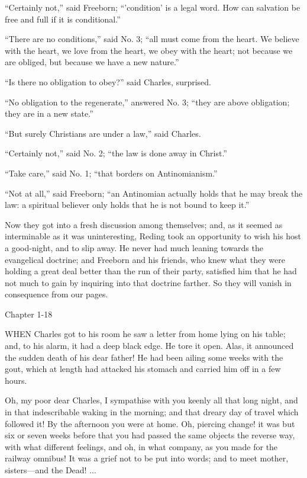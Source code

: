 ``Certainly not,'' said Freeborn; ``'condition' is a
legal word. How can salvation be free and full if it is
conditional.''

``There are no conditions,'' said No. 3; ``all must
come from the heart. We believe with the heart, we love from the
heart, we obey with the heart; not because we are obliged, but because
we have a new nature.''

``Is there no obligation to obey?'' said Charles,
surprised.

``No obligation to the regenerate,'' answered No. 3;
``they are above obligation; they are in a new state.''

``But surely Christians are under a law,'' said Charles.

``Certainly not,'' said No. 2; ``the law is done away
in Christ.''

``Take care,'' said No. 1; ``that borders on
Antinomianism.''

``Not at all,'' said Freeborn; ``an Antinomian actually
holds that he may break the law: a spiritual believer only holds that
he is not bound to keep it.''

Now they got into a fresh discussion among themselves; and, as it
seemed as interminable as it was uninteresting, Reding took an
opportunity to wish his host a good-night, and to slip away. He never
had much leaning towards the evangelical doctrine; and Freeborn and
his friends, who knew what they were holding a great deal better than
the run of their party, satisfied him that he had not much to gain by
inquiring into that doctrine farther. So they will vanish in
consequence from our pages.

Chapter 1-18


WHEN Charles got to his room he saw a
letter from home lying on his table; and, to his alarm, it had a deep
black edge. He tore it open. Alas, it announced the sudden death of
his dear father! He had been ailing some weeks with the gout, which at
length had attacked his stomach and carried him off in a few hours.

Oh, my poor dear Charles, I sympathise with you keenly all that
long night, and in that indescribable waking in the morning; and that
dreary day of travel which followed it! By the afternoon you were at
home. Oh, piercing change! it was but six or seven weeks before that
you had passed the same objects the reverse way, with what different
feelings, and oh, in what company, as you made for the railway
omnibus! It was a grief not to be put into words; and to meet mother,
sisters—and the Dead! ...

